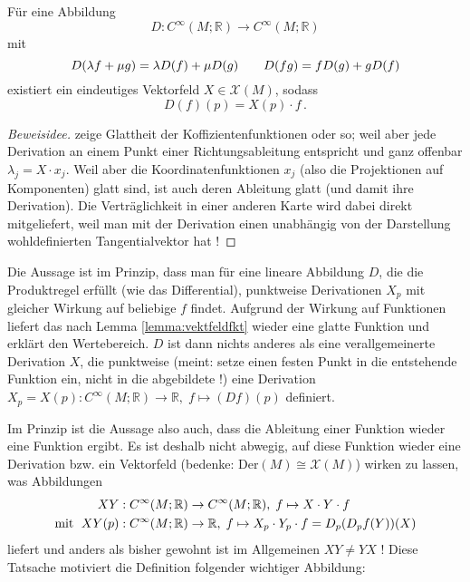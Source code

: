 \documentclass[../H_Analysis_main.tex]{subfiles}
\begin{document}
\begin{satz}
Für eine Abbildung
\begin{equation*}
D: C^\infty(M; \mathbb{R}) \rightarrow C^\infty(M; \mathbb{R})
\end{equation*}
mit
\begin{equation*}
D\qty(\lambda f + \mu g) = \lambda D(f) + \mu D(g) \qquad D(fg) = f D(g) + g D(f)
\end{equation*}
existiert ein eindeutiges Vektorfeld $X \in \mathcal{X}(M)$, sodass
\begin{equation}
D(f)(p) = X(p) \cdot f \, .
\end{equation}
\end{satz}
\begin{proof}[Beweisidee]
zeige Glattheit der Koffizientenfunktionen oder so; weil aber jede Derivation an einem Punkt einer Richtungsableitung entspricht und ganz offenbar $\lambda_j = X \cdot x_j$. Weil aber die Koordinatenfunktionen $x_j$ (also die Projektionen auf Komponenten) glatt sind, ist auch deren Ableitung glatt (und damit ihre Derivation). Die Verträglichkeit in einer anderen Karte wird dabei direkt mitgeliefert, weil man mit der Derivation einen unabhängig von der Darstellung wohldefinierten Tangentialvektor hat !
\end{proof}

Die Aussage ist im Prinzip, dass man für eine lineare Abbildung $D$, die die Produktregel erfüllt (wie das Differential), punktweise Derivationen $X_p$ mit gleicher Wirkung auf beliebige $f$ findet. Aufgrund der Wirkung auf Funktionen liefert das nach Lemma \ref{lemma:vektfeldfkt} wieder eine glatte Funktion und erklärt den Wertebereich. $D$ ist dann nichts anderes als eine verallgemeinerte Derivation $X$, die punktweise (meint: setze einen festen Punkt in die entstehende Funktion ein, nicht in die abgebildete !) eine Derivation $X_p = X(p): C^\infty(M; \mathbb{R}) \rightarrow \mathbb{R}, \; f \mapsto (Df)(p)$ definiert.%


Im Prinzip ist die Aussage also auch, dass die Ableitung einer Funktion wieder eine Funktion ergibt. Es ist deshalb nicht abwegig, auf diese Funktion wieder eine Derivation bzw. ein Vektorfeld (bedenke: $\text{Der}(M) \cong \mathcal{X}(M)$) wirken zu lassen, was Abbildungen
\begin{align*}
XY&: C^\infty(M; \mathbb{R}) \rightarrow C^\infty(M; \mathbb{R}), \; f \mapsto X \cdot Y \cdot f
\\
\text{mit } \; XY(p)&: C^\infty(M; \mathbb{R}) \rightarrow \mathbb{R}, \; f \mapsto X_p \cdot Y_p \cdot f = D_p \qty(D_p f(Y))(X)
\end{align*}
liefert und anders als bisher gewohnt ist im Allgemeinen $XY \neq YX$ ! Diese Tatsache motiviert die Definition folgender wichtiger Abbildung:
\end{document}
